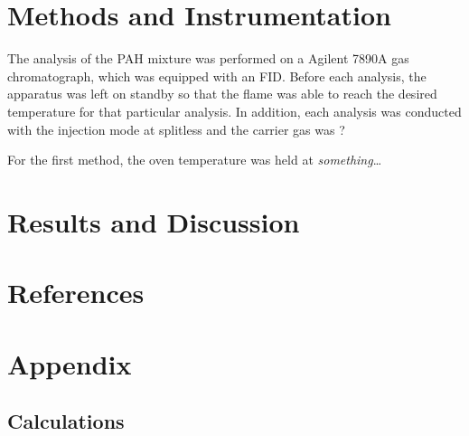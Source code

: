 \documentclass[a4paper, 12pt]{article}
\begin{document}

\section{Methods and Instrumentation}
The analysis of the PAH mixture was performed on a Agilent 7890A gas chromatograph, which was equipped with an FID. Before each analysis, the apparatus was left on standby so that the flame was able to reach the desired temperature for that particular analysis. In addition, each analysis was conducted with the injection mode at splitless and the carrier gas was ?

For the first method, the oven temperature was held at \textit{something}\ldots


\section{Results and Discussion}


\section{References}
\printbibliography


\section{Appendix}

\subsection{Calculations}
\end{document}
